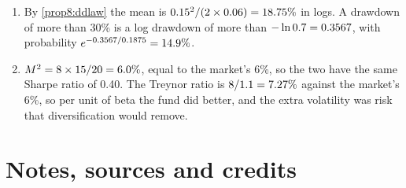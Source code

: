 \begin{chapterrefs}
\begin{enumerate}[label=\textbf{8.\arabic*}, leftmargin=*]
  \xhEw\%. The equal weighted standard deviation, with divisor three, is \xhDisp{} points and the
  asset weighted one \xhDispAw{} points. The large account's loss pulls the asset weighted return
  down.
  \item By \cref{prop8:ddlaw} the mean is $0.15^2/(2\times0.06)=18.75\%$ in logs. A drawdown of more
  than 30\% is a log drawdown of more than $-\ln0.7=0.3567$, with probability
  $e^{-0.3567/0.1875}=14.9\%$.
  \item $M^2=8\times15/20=6.0\%$, equal to the market's 6\%, so the two have the same Sharpe ratio of
  0.40. The Treynor ratio is $8/1.1=7.27\%$ against the market's 6\%, so per unit of beta the fund
  did better, and the extra volatility was risk that diversification would remove.
\end{enumerate}

\FloatBarrier
\section{Notes, sources and credits}
\label{sec8:credits}


\end{chapterrefs}
